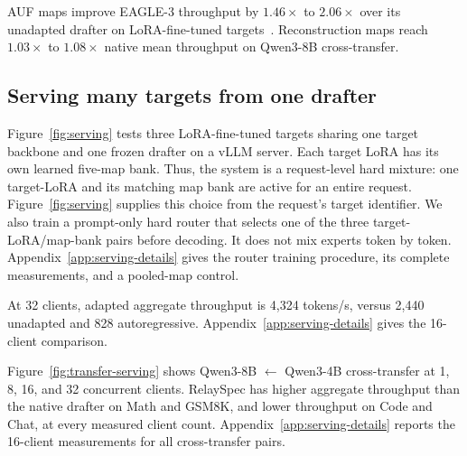 AUF maps improve EAGLE-3 throughput by $1.46\times$ to $2.06\times$ over its unadapted drafter on LoRA-fine-tuned targets~\citep{yang2026specauf}. Reconstruction maps reach $1.03\times$ to $1.08\times$ native mean throughput on Qwen3-8B cross-transfer.

\subsection{Serving many targets from one drafter}
\label{sec:serving}
Figure~\ref{fig:serving} tests three LoRA-fine-tuned targets sharing one target backbone and one frozen drafter on a vLLM server.  Each target LoRA has its own learned five-map bank.  Thus, the system is a request-level hard mixture: one target-LoRA and its matching map bank are active for an entire request.  Figure~\ref{fig:serving} supplies this choice from the request's target identifier.  We also train a prompt-only hard router that selects one of the three target-LoRA/map-bank pairs before decoding.  It does not mix experts token by token.  Appendix~\ref{app:serving-details} gives the router training procedure, its complete measurements, and a pooled-map control.



At 32 clients, adapted aggregate throughput is 4{,}324 tokens/s, versus 2{,}440 unadapted and 828 autoregressive. Appendix~\ref{app:serving-details} gives the 16-client comparison.

Figure~\ref{fig:transfer-serving} shows Qwen3-8B $\leftarrow$ Qwen3-4B cross-transfer at 1, 8, 16, and 32 concurrent clients. RelaySpec has higher aggregate throughput than the native drafter on Math and GSM8K, and lower throughput on Code and Chat, at every measured client count. Appendix~\ref{app:serving-details} reports the 16-client measurements for all cross-transfer pairs.


